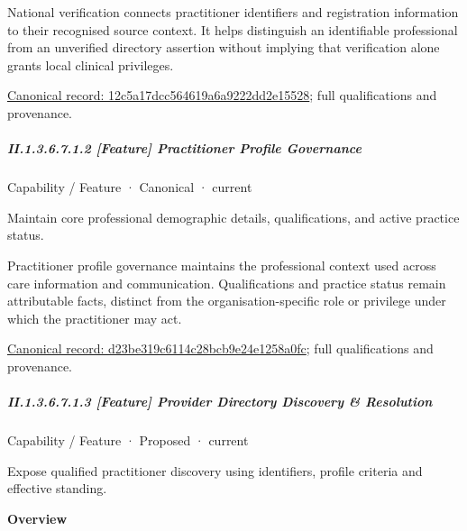 National verification connects practitioner identifiers and registration information to their recognised source context. It helps distinguish an identifiable professional from an unverified directory assertion without implying that verification alone grants local clinical privileges.


{\footnotesize \href{../../../../continuum/strategy/capability/feature/12c5a17dcc564619a6a9222dd2e15528.md}{Canonical record: 12c5a17dcc564619a6a9222dd2e15528}; full qualifications and provenance.}\par
\subparagraph*{II.1.3.6.7.1.2 [Feature] Practitioner Profile Governance}
\label{navigation:II.1.3.6.7.1.2}

\label{element:d23be319c6114c28bcb9e24e1258a0fc}
{\small Capability / Feature · Canonical · current}\par

Maintain core professional demographic details, qualifications, and active practice status.



Practitioner profile governance maintains the professional context used across care information and communication. Qualifications and practice status remain attributable facts, distinct from the organisation-specific role or privilege under which the practitioner may act.


{\footnotesize \href{../../../../continuum/strategy/capability/feature/d23be319c6114c28bcb9e24e1258a0fc.md}{Canonical record: d23be319c6114c28bcb9e24e1258a0fc}; full qualifications and provenance.}\par
\subparagraph*{II.1.3.6.7.1.3 [Feature] Provider Directory Discovery \& Resolution}
\label{navigation:II.1.3.6.7.1.3}

\label{element:cd3bd35f7f9e4852bbbce299bb795d8a}
{\small Capability / Feature · Proposed · current}\par

Expose qualified practitioner discovery using identifiers, profile criteria and effective standing.



\textbf{Overview}



